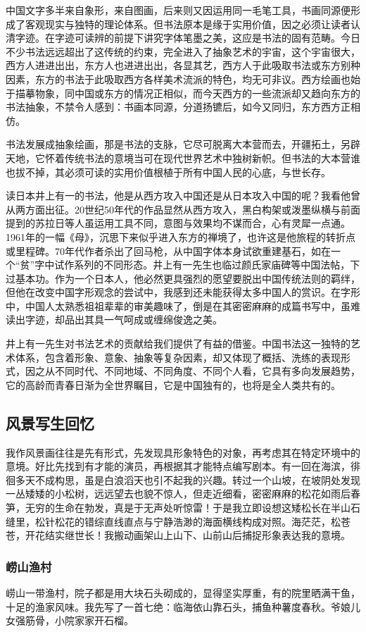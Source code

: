 \documentclass{article}
\begin{document}
中国文字多半来自象形，来自图画，后来则又因运用同一毛笔工具，书画同源便形成了客观现实与独特的理论体系。但书法原本是缘于实用价值，因之必须让读者认清字迹。在字迹可读辨的前提下讲究字体笔墨之美，这应是书法的固有范畴。今日不少书法远远超出了这传统的约束，完全进入了抽象艺术的宇宙，这个宇宙很大，西方人进进出出，东方人也进进出出，各显其艺，西方人于此吸取书法或东方别种因素，东方的书法于此吸取西方各样美术流派的特色，均无可非议。西方绘画也始于描摹物象，同中国或东方的情况正相似，而今天西方的一些流派却又趋向东方的书法抽象，不禁令人感到：书画本同源，分道扬镳后，如今又同归，东方西方正相仿。

书法发展成抽象绘画，那是书法的支脉，它尽可脱离大本营而去，开疆拓土，另辟天地，它怀着传统书法的意境当可在现代世界艺术中独树新帜。但书法的大本营谁也拔不掉，其必须可读的实用价值根植于所有中国人民的心底，与世长存。

读日本井上有一的书法，他是从西方攻入中国还是从日本攻入中国的呢？我看他曾从两方面出征。20世纪50年代的作品显然从西方攻入，黑白构架或泼墨纵横与前面提到的苏拉日等人虽运用工具不同，意图与效果均不谋而合，心有灵犀一点通。1961年的一幅《母》，沉思下来似乎进入东方的禅境了，也许这是他旅程的转折点或里程碑。70年代作者杀出了回马枪，从中国字体本身试欲重建基石，如在一个“贫”字中试作系列的不同形态。井上有一先生也临过颜氏家庙碑等中国法帖，下过基本功。作为一个日本人，他必然更具强烈的愿望要脱出中国传统法则的羁绊，但他在改变中国字形观念的尝试中，我感到还未能获得太多中国人的赏识。在字形中，中国人太熟悉祖祖辈辈的审美趣味了，倒是在其密密麻麻的成篇书写中，虽难读出字迹，却品出其具一气呵成或缠绵俊逸之美。

井上有一先生对书法艺术的贡献给我们提供了有益的借鉴。中国书法这一独特的艺术体系，包含着形象、意象、抽象等复杂因素，却又体现了概括、洗练的表现形式，因之从不同时代、不同地域、不同角度、不同个人看，它具有多向发展趋势，它的高龄而青春日渐为全世界瞩目，它是中国独有的，也将是全人类共有的。
\subsection{风景写生回忆}
我作风景画往往是先有形式，先发现具形象特色的对象，再考虑其在特定环境中的意境。好比先找到有才能的演员，再根据其才能特点编写剧本。有一回在海滨，徘徊多天不成构思，虽是白浪滔天也引不起我的兴趣。转过一个山坡，在坡阴处发现一丛矮矮的小松树，远远望去也貌不惊人，但走近细看，密密麻麻的松花如雨后春笋，无穷的生命在勃发，真是于无声处听惊雷！于是我立即设想这矮松长在半山石缝里，松针松花的错综直线直点与宁静浩渺的海面横线构成对照。海茫茫，松苍苍，开花结实继世长！我搬动画架山上山下、山前山后捕捉形象表达我的意境。
\subsubsection{崂山渔村}
崂山一带渔村，院子都是用大块石头砌成的，显得坚实厚重，有的院里晒满干鱼，十足的渔家风味。我先写了一首七绝：临海依山靠石头，捕鱼种薯度春秋。爷娘儿女强筋骨，小院家家开石榴。
\end{document}
